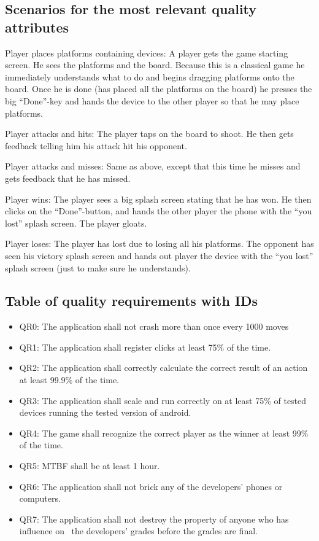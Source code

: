 \documentclass[12pt, a4paper]{article}
\begin{document}
\subsection{Scenarios for the most relevant quality attributes}
Player places platforms containing devices: A player gets the game starting screen. He sees the platforms and the board. Because this is a classical game he immediately understands what to do and begins dragging platforms onto the board. Once he is done (has placed all the platforms on the board) he presses the big “Done”-key and hands the device to the other player so that he may place platforms.

		Player attacks and hits: The player taps on the board to shoot. He then gets feedback telling him his attack hit his opponent.

		Player attacks and misses: Same as above, except that this time he misses and gets feedback that he has missed.

Player wins: The player sees a big splash screen stating that he has won. He
then clicks on the “Done”-button, and hands the other player the phone with the “you lost” splash screen. The player gloats.

		Player loses: The player has lost due to losing all his platforms. The opponent has seen his victory splash screen and hands out player the device with the “you lost” splash screen (just to make sure he understands).

\subsection{Table of quality requirements with IDs}
\begin{itemize}

\item QR0: The application shall not crash more than once every 1000 moves
\item QR1: The application shall register clicks at least 75\% of the time.
\item QR2: The application shall correctly calculate the correct result of an action at least 99.9\% of the time.
\item QR3: The application shall scale and run correctly on at least 75\% of tested devices running the tested version of android.
\item QR4: The game shall recognize the correct player as the winner at least 99\% of the time.
\item QR5: MTBF shall be at least 1 hour.
\item QR6: The application shall not brick any of the developers’ phones or computers.
\item QR7: The application shall not destroy the property of anyone who has influence on  the developers’ grades before the grades are final.

\end{itemize}
\end{document}
